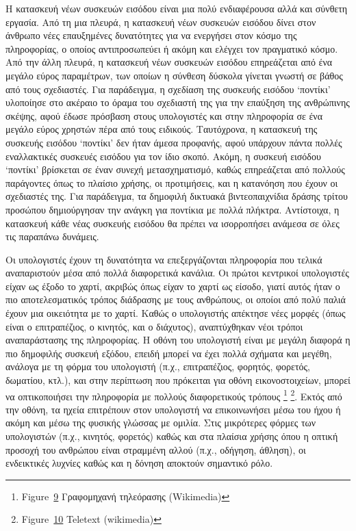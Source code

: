 \documentclass[
]{article}
\begin{document}
Η κατασκευή νέων συσκευών εισόδου είναι μια πολύ ενδιαφέρουσα αλλά και
σύνθετη εργασία. Από τη μια πλευρά, η κατασκευή νέων συσκευών εισόδου
δίνει στον άνθρωπο νέες επαυξημένες δυνατότητες για να ενεργήσει στον
κόσμο της πληροφορίας, ο οποίος αντιπροσωπεύει ή ακόμη και ελέγχει τον
πραγματικό κόσμο. Από την άλλη πλευρά, η κατασκευή νέων συσκευών εισόδου
επηρεάζεται από ένα μεγάλο εύρος παραμέτρων, των οποίων η σύνθεση
δύσκολα γίνεται γνωστή σε βάθος από τους σχεδιαστές. Για παράδειγμα, η
σχεδίαση της συσκευής εισόδου `ποντίκι' υλοποίησε στο ακέραιο το όραμα
του σχεδιαστή της για την επαύξηση της ανθρώπινης σκέψης, αφού έδωσε
πρόσβαση στους υπολογιστές και στην πληροφορία σε ένα μεγάλο εύρος
χρηστών πέρα από τους ειδικούς. Ταυτόχρονα, η κατασκευή της συσκευής
εισόδου `ποντίκι' δεν ήταν άμεσα προφανής, αφού υπάρχουν πάντα πολλές
εναλλακτικές συσκευές εισόδου για τον ίδιο σκοπό. Ακόμη, η συσκευή
εισόδου `ποντίκι' βρίσκεται σε έναν συνεχή μετασχηματισμό, καθώς
επηρεάζεται από πολλούς παράγοντες όπως το πλαίσιο χρήσης, οι
προτιμήσεις, και η κατανόηση που έχουν οι σχεδιαστές της. Για
παράδειγμα, τα δημοφιλή δικτυακά βιντεοπαιχνίδια δράσης τρίτου προσώπου
δημιούργησαν την ανάγκη για ποντίκια με πολλά πλήκτρα. Αντίστοιχα, η
κατασκευή κάθε νέας συσκευής εισόδου θα πρέπει να ισορροπήσει ανάμεσα σε
όλες τις παραπάνω δυνάμεις.

Οι υπολογιστές έχουν τη δυνατότητα να επεξεργάζονται πληροφορία που
τελικά αναπαριστούν μέσα από πολλά διαφορετικά κανάλια. Οι πρώτοι
κεντρικοί υπολογιστές είχαν ως έξοδο το χαρτί, ακριβώς όπως είχαν το
χαρτί ως είσοδο, γιατί αυτός ήταν ο πιο αποτελεσματικός τρόπος διάδρασης
με τους ανθρώπους, οι οποίοι από πολύ παλιά έχουν μια οικειότητα με το
χαρτί. Καθώς ο υπολογιστής απέκτησε νέες μορφές (όπως είναι ο
επιτραπέζιος, ο κινητός, και ο διάχυτος), αναπτύχθηκαν νέοι τρόποι
αναπαράστασης της πληροφορίας. Η οθόνη του υπολογιστή είναι με μεγάλη
διαφορά η πιο δημοφιλής συσκευή εξόδου, επειδή μπορεί να έχει πολλά
σχήματα και μεγέθη, ανάλογα με τη φόρμα του υπολογιστή (π.χ.,
επιτραπέζιος, φορητός, φορετός, δωματίου, κτλ.), και στην περίπτωση που
πρόκειται για οθόνη εικονοστοιχείων, μπορεί να οπτικοποιήσει την
πληροφορία με πολλούς διαφορετικούς τρόπους \footnote{Figure~\protect\hyperlink{fig:tv-typewriter}{9}
  Γραφομηχανή τηλεόρασης (Wikimedia)} \footnote{Figure~\protect\hyperlink{fig:teletext}{10}
  Teletext (wikimedia)}. Εκτός από την οθόνη, τα ηχεία επιτρέπουν στον
υπολογιστή να επικοινωνήσει μέσω του ήχου ή ακόμη και μέσω της φυσικής
γλώσσας με ομιλία. Στις μικρότερες φόρμες των υπολογιστών (π.χ.,
κινητός, φορετός) καθώς και στα πλαίσια χρήσης όπου η οπτική προσοχή του
ανθρώπου είναι στραμμένη αλλού (π.χ., οδήγηση, άθληση), οι ενδεικτικές
λυχνίες καθώς και η δόνηση αποκτούν σημαντικό ρόλο.
\end{document}
